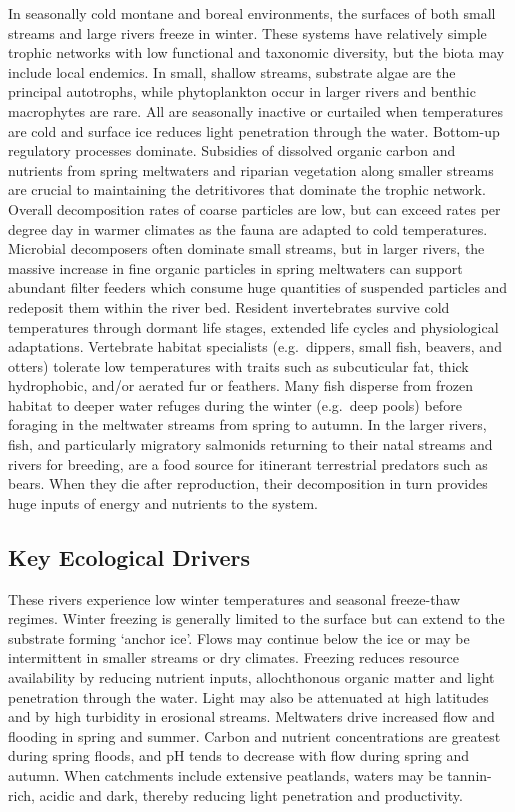 \documentclass[
  letterpaper,
  DIV=11,
  numbers=noendperiod]{scrartcl}
\begin{document}
In seasonally cold montane and boreal environments, the surfaces of both
small streams and large rivers freeze in winter. These systems have
relatively simple trophic networks with low functional and taxonomic
diversity, but the biota may include local endemics. In small, shallow
streams, substrate algae are the principal autotrophs, while
phytoplankton occur in larger rivers and benthic macrophytes are rare.
All are seasonally inactive or curtailed when temperatures are cold and
surface ice reduces light penetration through the water. Bottom-up
regulatory processes dominate. Subsidies of dissolved organic carbon and
nutrients from spring meltwaters and riparian vegetation along smaller
streams are crucial to maintaining the detritivores that dominate the
trophic network. Overall decomposition rates of coarse particles are
low, but can exceed rates per degree day in warmer climates as the fauna
are adapted to cold temperatures. Microbial decomposers often dominate
small streams, but in larger rivers, the massive increase in fine
organic particles in spring meltwaters can support abundant filter
feeders which consume huge quantities of suspended particles and
redeposit them within the river bed. Resident invertebrates survive cold
temperatures through dormant life stages, extended life cycles and
physiological adaptations. Vertebrate habitat specialists (e.g.~dippers,
small fish, beavers, and otters) tolerate low temperatures with traits
such as subcuticular fat, thick hydrophobic, and/or aerated fur or
feathers. Many fish disperse from frozen habitat to deeper water refuges
during the winter (e.g.~deep pools) before foraging in the meltwater
streams from spring to autumn. In the larger rivers, fish, and
particularly migratory salmonids returning to their natal streams and
rivers for breeding, are a food source for itinerant terrestrial
predators such as bears. When they die after reproduction, their
decomposition in turn provides huge inputs of energy and nutrients to
the system.

\subsection{Key Ecological Drivers}\label{key-ecological-drivers-111}

These rivers experience low winter temperatures and seasonal freeze-thaw
regimes. Winter freezing is generally limited to the surface but can
extend to the substrate forming `anchor ice'. Flows may continue below
the ice or may be intermittent in smaller streams or dry climates.
Freezing reduces resource availability by reducing nutrient inputs,
allochthonous organic matter and light penetration through the water.
Light may also be attenuated at high latitudes and by high turbidity in
erosional streams. Meltwaters drive increased flow and flooding in
spring and summer. Carbon and nutrient concentrations are greatest
during spring floods, and pH tends to decrease with flow during spring
and autumn. When catchments include extensive peatlands, waters may be
tannin-rich, acidic and dark, thereby reducing light penetration and
productivity.
\end{document}
